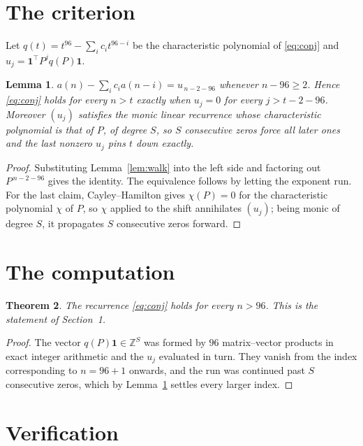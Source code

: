 \documentclass[11pt,a4paper]{article}
\theoremstyle{plain}
\newtheorem{theorem}{Theorem}
\newtheorem{lemma}[theorem]{Lemma}
\theoremstyle{definition}
\begin{document}
\section{The criterion}

Let $q(t)=t^{96}-\sum_i c_i t^{96-i}$ be the characteristic polynomial of
\eqref{eq:conj} and $u_j=\mathbf{1}^{\!\top}P^{j}q(P)\mathbf{1}$.

\begin{lemma}\label{lem:crit}
$a(n)-\sum_i c_i a(n-i)=u_{\,n-2-96}$ whenever $n-96\ge2$. Hence
\eqref{eq:conj} holds for every $n>t$ exactly when $u_j=0$ for every
$j>t-2-96$. Moreover $(u_j)$ satisfies the monic linear recurrence whose
characteristic polynomial is that of $P$, of degree $S$, so $S$ consecutive zeros force all
later ones and the last nonzero $u_j$ pins $t$ down exactly.
\end{lemma}

\begin{proof}
Substituting Lemma~\ref{lem:walk} into the left side and factoring out
$P^{\,n-2-96}$ gives the identity. The equivalence follows by letting the exponent
run. For the last claim, Cayley--Hamilton gives $\chi(P)=0$ for the characteristic
polynomial $\chi$ of $P$, so $\chi$ applied to the shift annihilates $(u_j)$; being monic of
degree $S$, it propagates $S$ consecutive zeros forward.
\end{proof}

\section{The computation}

\begin{theorem}
The recurrence \eqref{eq:conj} holds for every $n>96$. This is the statement of
Section~1.
\end{theorem}

\begin{proof}
The vector $q(P)\mathbf{1}\in\mathbb{Z}^{S}$ was formed by $96$ matrix--vector
products in exact integer arithmetic and the $u_j$ evaluated in turn. They vanish from the
index corresponding to $n=96+1$ onwards, and the run was continued past $S$ consecutive
zeros, which by Lemma~\ref{lem:crit} settles every larger index.
\end{proof}

\section{Verification}
\end{document}
